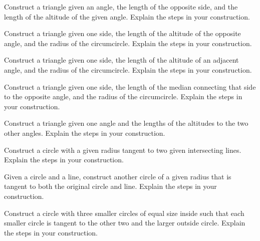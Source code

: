 \documentclass[nooutcomes]{ximera}
\begin{document}
\begin{problem}
Construct a triangle given an angle, the length of the opposite
  side, and the length of the altitude of the given angle. Explain the
  steps in your construction.
\end{problem}

\begin{problem}
Construct a triangle given one side, the length of the altitude
  of the opposite angle, and the radius of the circumcircle. Explain
  the steps in your construction.
\end{problem}

\begin{problem}
Construct a triangle given one side, the length of the altitude
  of an adjacent angle, and the radius of the circumcircle. Explain
  the steps in your construction.
\end{problem}

\begin{problem}
Construct a triangle given one side, the length of the median
  connecting that side to the opposite angle, and the radius of the
  circumcircle. Explain the steps in your construction.  
\end{problem}

\begin{problem}
Construct a triangle given one angle and the lengths of the
  altitudes to the two other angles. Explain the steps in your
  construction.
\end{problem}

\begin{problem}
Construct a circle with a given radius tangent to two given
  intersecting lines. Explain the steps in your construction.
\end{problem}

\begin{problem}
Given a circle and a line, construct another circle of a given
  radius that is tangent to both the original circle and line. Explain
  the steps in your construction.
\end{problem}

\begin{problem}
Construct a circle with three smaller circles of equal size
  inside such that each smaller circle is tangent to the other two and
  the larger outside circle. Explain the steps in your construction.
\end{problem}
\end{document}
